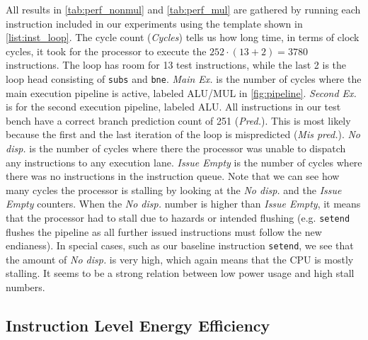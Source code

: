 All results in \autoref{tab:perf_nonmul} and \autoref{tab:perf_mul} are gathered
by running each instruction included in our experiments using the template shown
in \autoref{list:inst_loop}. The cycle count (\emph{Cycles}) tells us how long
time, in terms of clock cycles, it took for the processor to execute the $252
\cdot (13+2) = 3780$ instructions. The loop has room for 13 test instructions,
while the last 2 is the loop head consisting of \texttt{subs} and \texttt{bne}.
\emph{Main Ex.} is the number of cycles where the main execution pipeline is
active, labeled ALU/MUL in \autoref{fig:pipeline}. \emph{Second Ex.} is for the
second execution pipeline, labeled ALU.  All instructions in our test bench have
a correct branch prediction count of 251 (\emph{Pred.}). This is most likely
because the first and the last iteration of the loop is mispredicted (\emph{Mis
pred.}). \emph{No disp.} is the number of cycles where there the processor was
unable to dispatch any instructions to any execution lane.
\emph{Issue Empty} is the number of cycles where there was no instructions in
the instruction queue. Note that we can see how many cycles the processor is stalling by looking at
the \emph{No disp.} and the \emph{Issue Empty} counters. When the \emph{No
disp.} number is higher than \emph{Issue Empty}, it means that the processor had
to stall due to hazards or intended flushing (e.g. \texttt{setend} flushes the
pipeline as all further issued instructions must follow the new endianess).
In special cases, such as our baseline instruction \texttt{setend}, we see
that the amount of \emph{No disp.} is very high, which again means that
the CPU is mostly stalling. It seems to be a strong relation between low
power usage and high stall numbers.


\subsection{Instruction Level Energy Efficiency}

